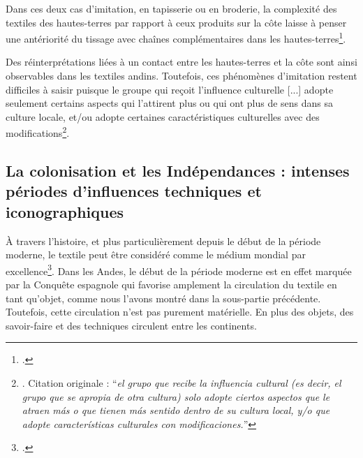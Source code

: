 Dans ces deux cas d'imitation, en tapisserie ou en broderie, la complexité des textiles des hautes-terres par rapport à ceux produits sur la côte laisse à penser une antériorité du tissage avec chaînes complémentaires dans les hautes-terres\footcite[p.~8]{desrosiersHighlandComplementaryWarpWeaving2014}. 

Des réinterprétations liées à un contact entre les hautes-terres et la côte sont ainsi observables dans les textiles andins. Toutefois, ces phénomènes d'imitation restent difficiles à saisir puisque \og le groupe qui reçoit l'influence culturelle [...] adopte seulement certains aspects qui l'attirent plus ou qui ont plus de sens dans sa culture locale, et/ou adopte certaines caractéristiques culturelles avec des modifications\footnote{\cite[p.~10]{youngMontanaMarIntercambio2017}. Citation originale : \textquotedblleft \textit{el grupo que recibe la influencia cultural (es decir, el grupo que se apropia de otra cultura) solo adopte ciertos aspectos que le atraen más o que tienen más sentido dentro de su cultura local, y/o que adopte características culturales con modificaciones.}\textquotedblright}.\fg \\

\subsection{La colonisation et les Indépendances : intenses périodes d'influences techniques et iconographiques}

\og À travers l'histoire, et plus particulièrement depuis le début de la période moderne, le textile peut être considéré comme le médium mondial par excellence\footcite[p.~21]{ferreiraTextilesPeriodeModerne2016}\fg. Dans les Andes, le début de la période moderne est en effet marquée par la Conquête espagnole qui favorise amplement la circulation du textile en tant qu'objet, comme nous l'avons montré dans la sous-partie précédente. Toutefois, cette circulation n'est pas purement matérielle. En plus des objets, des savoir-faire et des techniques circulent entre les continents.

